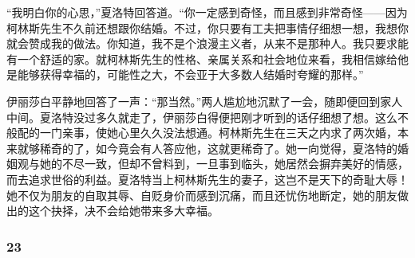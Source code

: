 \par “我明白你的心思，”夏洛特回答道。“你一定感到奇怪，而且感到非常奇怪——因为柯林斯先生不久前还想跟你结婚。不过，你只要有工夫把事情仔细想一想，我想你就会赞成我的做法。你知道，我不是个浪漫主义者，从来不是那种人。我只要求能有一个舒适的家。就柯林斯先生的性格、亲属关系和社会地位来看，我相信嫁给他是能够获得幸福的，可能性之大，不会亚于大多数人结婚时夸耀的那样。”
\par 伊丽莎白平静地回答了一声：“那当然。”两人尴尬地沉默了一会，随即便回到家人中间。夏洛特没过多久就走了，伊丽莎白得便把刚才听到的话仔细想了想。这么不般配的一门亲事，使她心里久久没法想通。柯林斯先生在三天之内求了两次婚，本来就够稀奇的了，如今竟会有人答应他，这就更稀奇了。她一向觉得，夏洛特的婚姻观与她的不尽一致，但却不曾料到，一旦事到临头，她居然会摒弃美好的情感，而去追求世俗的利益。夏洛特当上柯林斯先生的妻子，这岂不是天下的奇耻大辱！她不仅为朋友的自取其辱、自贬身价而感到沉痛，而且还忧伤地断定，她的朋友做出的这个抉择，决不会给她带来多大幸福。



\subsubsection*{23}


